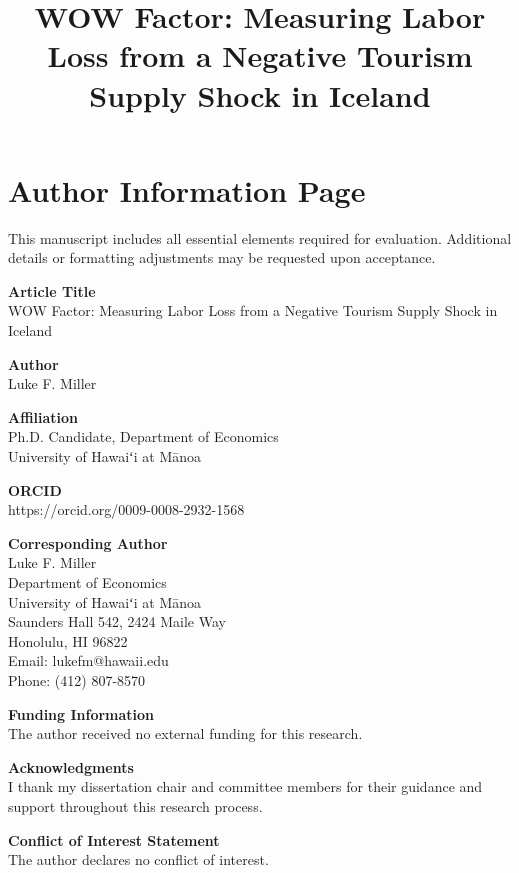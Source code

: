 \documentclass[12pt]{article}
\title{WOW Factor: Measuring Labor Loss from a Negative Tourism Supply Shock in Iceland}
\date{}
\begin{document}
\maketitle
\clearpage
\newpage
\section*{Author Information Page}

This manuscript includes all essential elements required for evaluation. Additional details or formatting adjustments may be requested upon acceptance.

\noindent
\textbf{Article Title} \\
WOW Factor: Measuring Labor Loss from a Negative Tourism Supply Shock in Iceland

\noindent
\textbf{Author} \\
Luke F. Miller

\noindent
\textbf{Affiliation} \\
Ph.D. Candidate, Department of Economics \\
University of Hawaiʻi at Mānoa

\noindent
\textbf{ORCID} \\
https://orcid.org/0009-0008-2932-1568

\noindent
\textbf{Corresponding Author} \\
Luke F. Miller \\
Department of Economics \\
University of Hawaiʻi at Mānoa \\
Saunders Hall 542, 2424 Maile Way \\
Honolulu, HI 96822 \\
Email: lukefm@hawaii.edu \\
Phone: (412) 807-8570

\noindent
\textbf{Funding Information} \\
The author received no external funding for this research.

\noindent
\textbf{Acknowledgments} \\
I thank my dissertation chair and committee members for their guidance and support throughout this research process.

\noindent
\textbf{Conflict of Interest Statement} \\
The author declares no conflict of interest.

\clearpage
\end{document}
